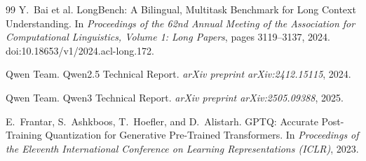 \documentclass[10pt,twocolumn]{article}
\begin{document}
\begin{thebibliography}{99}
Y.~Bai et al.
LongBench: A Bilingual, Multitask Benchmark for Long Context
Understanding.
In \emph{Proceedings of the 62nd Annual Meeting of the
Association for Computational Linguistics, Volume 1: Long
Papers}, pages 3119--3137, 2024.
doi:10.18653/v1/2024.acl-long.172.

Qwen Team.
Qwen2.5 Technical Report.
\emph{arXiv preprint arXiv:2412.15115}, 2024.

Qwen Team.
Qwen3 Technical Report.
\emph{arXiv preprint arXiv:2505.09388}, 2025.

E.~Frantar, S.~Ashkboos, T.~Hoefler, and D.~Alistarh.
GPTQ: Accurate Post-Training Quantization for Generative
Pre-Trained Transformers.
In \emph{Proceedings of the Eleventh International Conference
on Learning Representations (ICLR)}, 2023.

\end{thebibliography}
\end{document}
